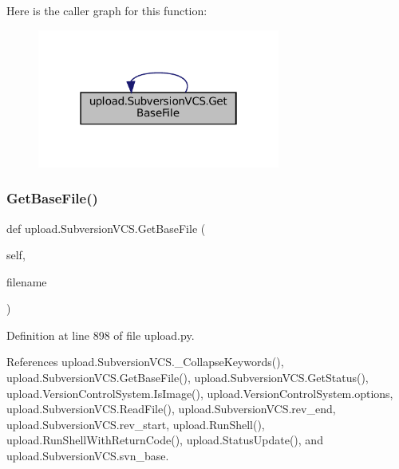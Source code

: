 Here is the caller graph for this function\+:
\nopagebreak
\begin{figure}[H]
\begin{center}
\leavevmode
\includegraphics[width=226pt]{classupload_1_1SubversionVCS_a29dec4941de0824734d6842a2f33ffc3_icgraph}
\end{center}
\end{figure}
\mbox{\label{classupload_1_1SubversionVCS_a29dec4941de0824734d6842a2f33ffc3}} 
\subsubsection{\texorpdfstring{Get\+Base\+File()}{GetBaseFile()}\hspace{0.1cm}{\footnotesize\ttfamily [2/2]}}
{\footnotesize\ttfamily def upload.\+Subversion\+V\+C\+S.\+Get\+Base\+File (\begin{DoxyParamCaption}\item[{}]{self,  }\item[{}]{filename }\end{DoxyParamCaption})}



Definition at line 898 of file upload.\+py.



References upload.\+Subversion\+V\+C\+S.\+\_\+\+Collapse\+Keywords(), upload.\+Subversion\+V\+C\+S.\+Get\+Base\+File(), upload.\+Subversion\+V\+C\+S.\+Get\+Status(), upload.\+Version\+Control\+System.\+Is\+Image(), upload.\+Version\+Control\+System.\+options, upload.\+Subversion\+V\+C\+S.\+Read\+File(), upload.\+Subversion\+V\+C\+S.\+rev\+\_\+end, upload.\+Subversion\+V\+C\+S.\+rev\+\_\+start, upload.\+Run\+Shell(), upload.\+Run\+Shell\+With\+Return\+Code(), upload.\+Status\+Update(), and upload.\+Subversion\+V\+C\+S.\+svn\+\_\+base.


